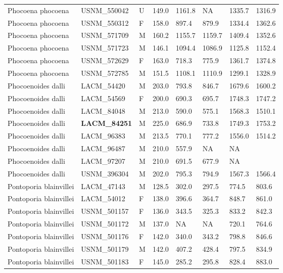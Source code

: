 \begin{longtable}{|p{1.95in}p{1.1in}p{.15in}p{.4in}p{.4in}p{.4in}p{.4in}p{.4in}|}
  Phocoena phocoena & USNM\_550042 & U & 149.0 & 1161.8 & NA & 1335.7 & 1316.9 \\ 
  Phocoena phocoena & USNM\_550312 & F & 158.0 & 897.4 & 879.9 & 1334.4 & 1362.6 \\ 
  Phocoena phocoena & USNM\_571709 & M & 160.2 & 1155.7 & 1159.7 & 1409.4 & 1352.6 \\ 
  Phocoena phocoena & USNM\_571723 & M & 146.1 & 1094.4 & 1086.9 & 1125.8 & 1152.4 \\ 
  Phocoena phocoena & USNM\_572629 & F & 163.0 & 718.3 & 775.9 & 1361.7 & 1374.8 \\ 
  Phocoena phocoena & USNM\_572785 & M & 151.5 & 1108.1 & 1110.9 & 1299.1 & 1328.9 \\ 
  Phocoenoides dalli & LACM\_54420 & M & 203.0 & 793.8 & 846.7 & 1679.6 & 1600.2 \\ 
  Phocoenoides dalli & LACM\_54569 & F & 200.0 & 690.3 & 695.7 & 1748.3 & 1747.2 \\ 
  Phocoenoides dalli & LACM\_84048 & M & 213.0 & 590.0 & 575.1 & 1568.3 & 1510.1 \\ 
  Phocoenoides dalli & \textbf{ LACM\_84251 } & M & 225.0 & 686.9 & 733.8 & 1749.3 & 1753.2 \\ 
  Phocoenoides dalli & LACM\_96383 & M & 213.5 & 770.1 & 777.2 & 1556.0 & 1514.2 \\ 
  Phocoenoides dalli & LACM\_96487 & M & 210.0 & 557.9 & NA & NA &  \\ 
  Phocoenoides dalli & LACM\_97207 & M & 210.0 & 691.5 & 677.9 & NA &  \\ 
  Phocoenoides dalli & USNM\_396304 & M & 202.0 & 795.3 & 794.9 & 1567.3 & 1566.4 \\ 
  Pontoporia blainvillei & LACM\_47143 & M & 128.5 & 302.0 & 297.5 & 774.5 & 803.6 \\ 
  Pontoporia blainvillei & LACM\_54012 & F & 138.0 & 396.6 & 364.7 & 848.7 & 861.0 \\ 
  Pontoporia blainvillei & USNM\_501157 & F & 136.0 & 343.5 & 325.3 & 833.2 & 842.3 \\ 
  Pontoporia blainvillei & USNM\_501172 & M & 137.0 & NA & NA & 720.1 & 764.6 \\ 
  Pontoporia blainvillei & USNM\_501176 & F & 142.0 & 340.0 & 343.2 & 798.8 & 846.6 \\ 
  Pontoporia blainvillei & USNM\_501179 & M & 142.0 & 407.2 & 428.4 & 797.5 & 834.9 \\ 
  Pontoporia blainvillei & USNM\_501183 & F & 145.0 & 285.2 & 295.8 & 828.4 & 883.0 \\ 

\end{longtable}
